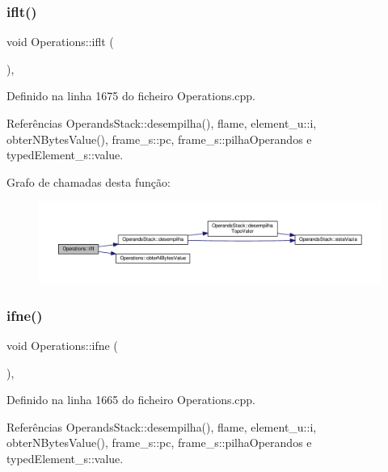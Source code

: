 \subsubsection{\texorpdfstring{iflt()}{iflt()}}
{\footnotesize\ttfamily void Operations\+::iflt (\begin{DoxyParamCaption}{ }\end{DoxyParamCaption})\hspace{0.3cm}{\ttfamily [static]}, {\ttfamily [private]}}



Definido na linha 1675 do ficheiro Operations.\+cpp.



Referências Operands\+Stack\+::desempilha(), flame, element\+\_\+u\+::i, obter\+N\+Bytes\+Value(), frame\+\_\+s\+::pc, frame\+\_\+s\+::pilha\+Operandos e typed\+Element\+\_\+s\+::value.

Grafo de chamadas desta função\+:
\nopagebreak
\begin{figure}[H]
\begin{center}
\leavevmode
\includegraphics[width=350pt]{classOperations_a0a9460ea938fc3a9bbd2102578d50ee2_cgraph}
\end{center}
\end{figure}
\mbox{\label{classOperations_aaadc2a6aaf1d3be06e918930622dad29}} 
\subsubsection{\texorpdfstring{ifne()}{ifne()}}
{\footnotesize\ttfamily void Operations\+::ifne (\begin{DoxyParamCaption}{ }\end{DoxyParamCaption})\hspace{0.3cm}{\ttfamily [static]}, {\ttfamily [private]}}



Definido na linha 1665 do ficheiro Operations.\+cpp.



Referências Operands\+Stack\+::desempilha(), flame, element\+\_\+u\+::i, obter\+N\+Bytes\+Value(), frame\+\_\+s\+::pc, frame\+\_\+s\+::pilha\+Operandos e typed\+Element\+\_\+s\+::value.

